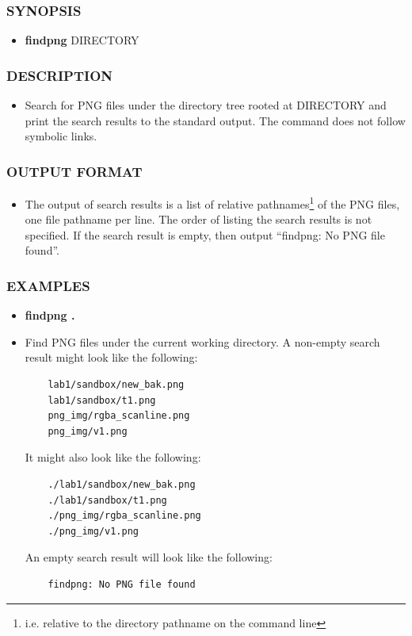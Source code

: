 \subsubsection*{SYNOPSIS}
\begin{itemize}
	\item[]{\bf findpng} DIRECTORY 
\end{itemize}
\subsubsection*{DESCRIPTION}
\begin{itemize}
	\item[]Search for PNG files under the directory tree rooted at DIRECTORY and print the search results to the standard output. The command does not follow symbolic links.
\end{itemize}
\subsubsection*{OUTPUT FORMAT}
\begin{itemize}
	\item[]The output of search results is a list of relative pathnames\footnote{i.e. relative to the directory pathname on the command line} of the PNG files, one file pathname per line. The order of listing the search results is not specified. If the search result is empty, then output ``findpng: No PNG file found''.
\end{itemize}
\subsubsection*{EXAMPLES}
\begin{itemize}
	\item[]{\bf findpng .}
	\item[]Find PNG files under the current working directory. A non-empty search result might look like the following:
	\begin{verbatim}
	lab1/sandbox/new_bak.png
	lab1/sandbox/t1.png
	png_img/rgba_scanline.png
	png_img/v1.png
	\end{verbatim}
    It might also look like the following:
	\begin{verbatim}
	./lab1/sandbox/new_bak.png
	./lab1/sandbox/t1.png
	./png_img/rgba_scanline.png
	./png_img/v1.png
	\end{verbatim}
	An empty search result will look like the following:
	\begin{verbatim}
	findpng: No PNG file found
	\end{verbatim}
\end{itemize}

